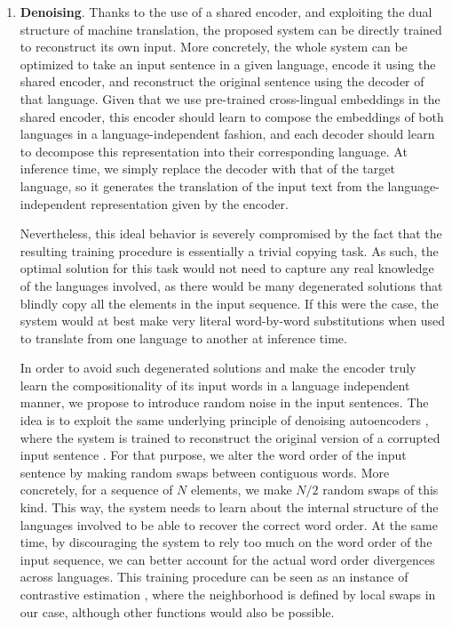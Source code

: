 \documentclass{article} \usepackage{iclr2018_conference,times}
\begin{document}
\begin{enumerate}
\item \textbf{Denoising}. Thanks to the use of a shared encoder, and exploiting the dual structure of machine translation, the proposed system can be directly trained to reconstruct its own input. More concretely, the whole system can be optimized to take an input sentence in a given language, encode it using the shared encoder, and reconstruct the original sentence using the decoder of that language. Given that we use pre-trained cross-lingual embeddings in the shared encoder, this encoder should learn to compose the embeddings of both languages in a language-independent fashion, and each decoder should learn to decompose this representation into their corresponding language. At inference time, we simply replace the decoder with that of the target language, so it generates the translation of the input text from the language-independent representation given by the encoder.

Nevertheless, this ideal behavior is severely compromised by the fact that the resulting training procedure is essentially a trivial copying task. As such, the optimal solution for this task would not need to capture any real knowledge of the languages involved, as there would be many degenerated solutions that blindly copy all the elements in the input sequence. If this were the case, the system would at best make very literal word-by-word substitutions when used to translate from one language to another at inference time.

In order to avoid such degenerated solutions and make the encoder truly learn the compositionality of its input words in a language independent manner, we propose to introduce random noise in the input sentences. The idea is to exploit the same underlying principle of denoising autoencoders \citep{vincent2010stacked}, where the system is trained to reconstruct the original version of a corrupted input sentence \citep{dai2015semisupervised,hill2016learning}. For that purpose, we alter the word order of the input sentence by making random swaps between contiguous words. More concretely, for a sequence of $N$ elements, we make $N/2$ random swaps of this kind. This way, the system needs to learn about the internal structure of the languages involved to be able to recover the correct word order. At the same time, by discouraging the system to rely too much on the word order of the input sequence, we can better account for the actual word order divergences across languages. This training procedure can be seen as an instance of contrastive estimation \citep{smith2005contrastive}, where the neighborhood is defined by local swaps in our case, although other functions would also be possible.


\end{enumerate}
\end{document}

